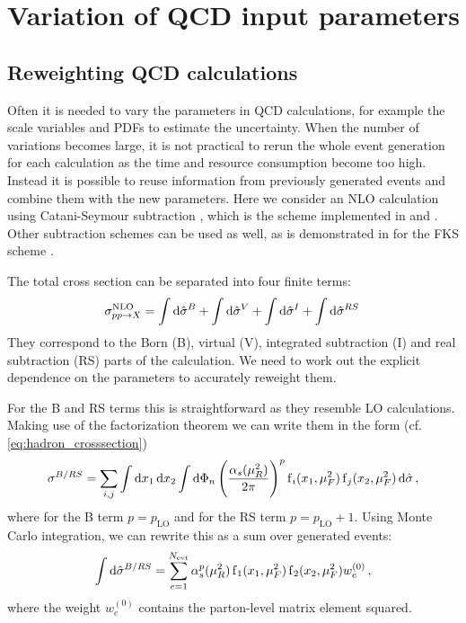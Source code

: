 
\chapter{Variation of QCD input parameters}
\label{ch:parameter_variation}
%
\section{Reweighting QCD calculations}
Often it is needed to vary the parameters in QCD calculations, for example the scale variables and PDFs to estimate the uncertainty.
When the number of variations becomes large, it is not practical to rerun the whole event generation for each calculation as the time and resource consumption become too high.
Instead it is possible to reuse information from previously generated events and combine them with the new parameters.
Here we consider an NLO calculation using Catani-Seymour subtraction \cite{catani_seymour1997}, which is the scheme implemented in \sherpa{} and \mcgrid{}.
Other subtraction schemes can be used as well, as is demonstrated in \cite{amcfast} for the FKS scheme \cite{fks_a,fks_b}.

The total cross section can be separated into four finite terms:
%
\begin{equation}
	\sigma^\text{NLO}_{pp \rightarrow X} = \int \dif \hat \sigma^B + \int \dif \hat \sigma^V + \int \dif \hat \sigma^I + \int \dif \hat \sigma^{RS} \,
\end{equation}
%
They correspond to the Born (B), virtual (V), integrated subtraction (I) and real subtraction (RS) parts of the calculation.
We need to work out the explicit dependence on the parameters to accurately reweight them.

For the B and RS terms this is straightforward as they resemble LO calculations.
Making use of the factorization theorem we can write them in the form (cf. \cref{eq:hadron_crosssection})
%
\begin{equation}
	\sigma^{B/RS} = \sum_{i,j} \int \dif x_1 \dif x_2 \int \dif \Phi_n \left( \frac{\alpha_s(\mu_R^2)}{2 \pi} \right)^p \pdf_i(x_1,\mu_F^2) \pdf_j(x_2,\mu_F^2) \dif \hat\sigma \, ,
\end{equation}
%
where for the B term $p = p_\text{LO}$ and for the RS term $p = p_\text{LO} + 1$.
Using Monte Carlo integration, we can rewrite this as a sum over generated events:
%
\begin{equation}
  \int \dif \hat \sigma^{B/RS} = \sum_{e=1}^{N_\text{evt}} \alpha_s^p(\mu_R^2) \pdf_1(x_1,\mu_F^2) \pdf_2(x_2,\mu_F^2) w_e^{(0)} \, ,
  \label{eq:reweight_lo}
\end{equation}
%
where the weight $w_e^{(0)}$ contains the parton-level matrix element squared.

